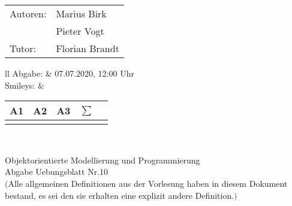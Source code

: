 \documentclass[12pt,a4paper,oneside,ngerman]{article}
\newcommand{\fach}{Objektorientierte Modellierung und Programmierung}
\newcommand{\dokumentenTitel}{Abgabe Uebungsblatt Nr.10}
\newcommand{\Abgabe}{07.07.2020, 12:00 Uhr}
\newcommand{\memberOne}{Marius Birk}
\newcommand{\memberTwo}{Pieter Vogt}
\newcommand{\tutor}{ Florian Brandt }
\begin{document}
	\thispagestyle{plain} %
	
	\begin{multicols}{2} %
		\hspace{-1cm} %
		\begin{tabular}{ll} %
			Autoren: & \memberOne \\ %
			& \memberTwo \\
			Tutor: & \tutor \\  
		\end{tabular}
		
		\columnbreak %
		\hspace{-1cm} %
		\begin{tabular}{ll} %
			Abgabe: & \Abgabe \\ %
			Smileys: &  
			\renewcommand{\arraystretch}{1.2} 
			\begin{tabular}{|p{0.8cm}|p{0.8cm}|p{0.8cm}|p{0.8cm}|p{0.8cm}|}
				\hline A1 & A2 & A3 &$\sum\limits^{ }$ \\ \hline
				& & & \\ \hline    
			\end{tabular} \\
		\end{tabular}
		
	\end{multicols} %
	
	\begin{center}
		\Large{\fach} \\
		\LARGE{\dokumentenTitel} \\
		\small
		$($Alle allgemeinen Definitionen aus der Vorlesung haben in diesem Dokument bestand, es sei den sie erhalten eine explizit andere Definition.$)$
	\end{center}
\end{document}
